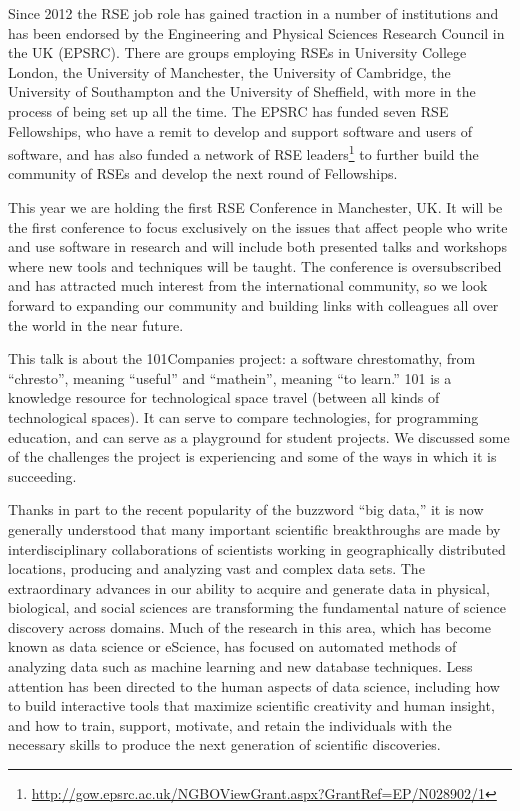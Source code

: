 \documentclass[a4paper,UKenglish]{dagrep}
\begin{document}
Since 2012 the RSE job role has gained traction in a number of institutions and has been endorsed by the Engineering and Physical Sciences Research Council in the UK (EPSRC). There are groups employing RSEs in University College London, the University of Manchester, the University of Cambridge, the University of Southampton and the University of Sheffield, with more in the process of being set up all the time. The EPSRC has funded seven RSE Fellowships, who have a remit to develop and support software and users of software, and has also funded a network of RSE leaders\footnote{\url{http://gow.epsrc.ac.uk/NGBOViewGrant.aspx?GrantRef=EP/N028902/1}} to further build the community of RSEs and develop the next round of Fellowships.

This year we are holding the first RSE Conference in Manchester, UK. It will be the first conference to focus exclusively on the issues that affect people who write and use software in research and will include both presented talks and workshops where new tools and techniques will be taught. The conference is oversubscribed and has attracted much interest from the international community, so we look forward to expanding our community and building links with colleagues all over the world in the near future.


 This talk is about the 101Companies project: a software chrestomathy, from ``chresto'', meaning ``useful'' and ``mathein'', meaning ``to learn.'' 101 is a knowledge resource for technological space travel (between all kinds of technological spaces). It can serve to compare technologies, for programming education, and can serve as a playground for student projects. We discussed some of the challenges the project is experiencing and some of the ways in which it is succeeding. 


Thanks in part to the recent popularity of the buzzword ``big data,'' it is now generally understood that many important scientific breakthroughs are made by interdisciplinary collaborations of scientists working in geographically distributed locations, producing and analyzing vast and complex data sets. The extraordinary advances in our ability to acquire and generate data in physical, biological, and social sciences are transforming the fundamental nature of science discovery across domains. Much of the research in this area, which has become known as data science or eScience, has focused on automated methods of analyzing data such as machine learning and new database techniques. Less attention has been directed to the human aspects of data science, including how to build interactive tools that maximize scientific creativity and human insight, and how to train, support, motivate, and retain the individuals with the necessary skills to produce the next generation of scientific discoveries.
\end{document}
